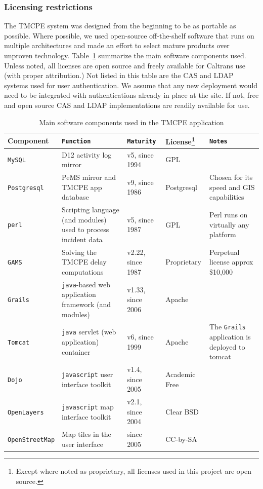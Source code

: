 \documentclass[12pt]{report}
\begin{document}
\subsubsection{Licensing restrictions}
\label{sec:portability-licensing}

The \ac{TMCPE} system was designed from the beginning to be as portable as
possible.  Where possible, we used open-source off-the-shelf software that runs
on multiple architectures and made an effort to select mature products over
unproven technology.  Table~\ref{tab:software-components} summarize the main
software components used.  Unless noted, all licenses are open source and freely
available for Caltrans use (with proper attribution.)  Not listed in this table
are the \ac{CAS} and \ac{LDAP} systems used for user authentication.  We assume
that any new deployment would need to be integrated with authentications already
in place at the site.  If not, free and open source \ac{CAS} and \ac{LDAP}
implementations are readily available for use.
\begin{table}
  \centering
  \footnotesize
  \begin{tabularx}{\textwidth}{llllX}
    \hline
    \textbf{Component} & \texttt{Function} & \texttt{Maturity} & License\footnote{Except where noted as proprietary, all licenses used in this project are open source.} & \texttt{Notes} \\
    \hline
    \texttt{MySQL} & \ac{D12} activity log mirror &  v5, since 1994 & GPL & ~ \\
    \texttt{Postgresql} & \ac{PeMS} mirror and \ac{TMCPE} app database & v9, since 1986 & Postgresql & Chosen for its speed and \acs{GIS} capabilities\\
    \texttt{perl} & Scripting language (and modules) used to process incident data & v5, since 1987 & GPL & Perl runs on virtually any platform \\
    \texttt{GAMS} & Solving the \ac{TMCPE} delay computations & v2.22, since 1987 & Proprietary & Perpetual license approx \$10,000 \\
    \texttt{Grails} & \texttt{java}-based web application framework (and modules) & v1.33, since 2006 & Apache & ~ \\
    \texttt{Tomcat} & \texttt{java} servlet (web application) container & v6, since 1999 & Apache & The \texttt{Grails} application is deployed to tomcat \\
    \texttt{Dojo} & \texttt{javascript} user interface toolkit & v1.4, since 2005 & Academic Free & ~ \\
    \texttt{OpenLayers} & \texttt{javascript} map interface toolkit & v2.1, since 2004 & Clear BSD & ~ \\
    \texttt{OpenStreetMap} & Map tiles in the user interface & since 2005 & CC-by-SA & ~ \\
    \hline
  \end{tabularx}
  \caption{Main software components used in the TMCPE application}
  \label{tab:software-components}
\end{table}
\end{document}
